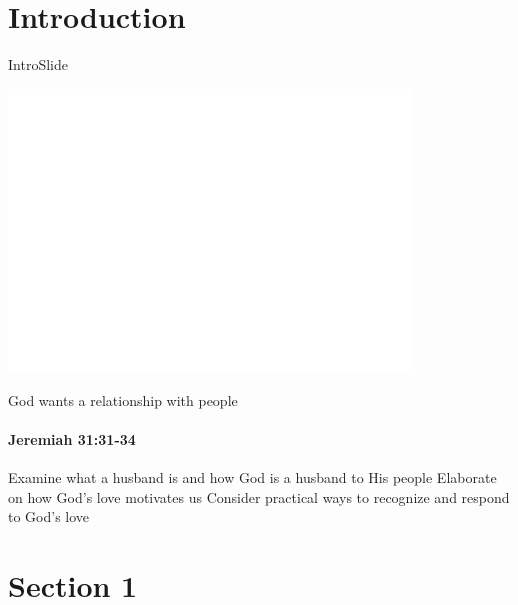 
\section{Introduction}
\begin{frame}{IntroSlide}
\begin{center}
	\includegraphics[draft, width=0.8\textwidth]{figures/dummy.png}
\end{center}

\end{frame}

\begin{frame}{God wants a relationship with people}
\framesubtitle{Jeremiah 31:31-34}
	
\end{frame}

\begin{goals}
\goal Examine what a husband is and how God is a husband to His people
\goal Elaborate on how God's love motivates us
\goal Consider practical ways to recognize and respond to God's love

\end{goals}

\section{Section 1}

